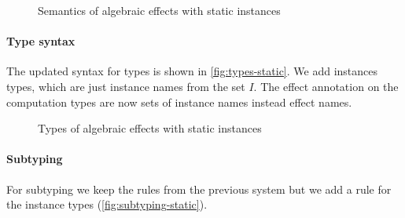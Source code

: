 {\begin{figure}
\caption{Semantics of algebraic effects with static instances}
\centering
{}
\end{figure}

\paragraph{Type syntax}
The updated syntax for types is shown in \cref{fig:types-static}.
We add instances types, which are just instance names from the set $I$.
The effect annotation on the computation types are now sets of instance names instead effect names.

\begin{figure}
\caption{Types of algebraic effects with static instances}
\centering
{}
\end{figure}

\paragraph{Subtyping}
For subtyping we keep the rules from the previous system but we add a rule for the instance types (\cref{fig:subtyping-static}).

}
